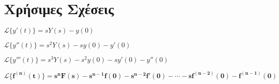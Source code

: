 \section*{Χρήσιμες Σχέσεις}
\centering
\begin{myitemize}
  \item $ \mathcal{L}\{y'(t)\} = sY(s) - y(0) $
  \item $ \mathcal{L}\{y''(t)\} = s^{2}Y(s) - sy(0) - y'(0) $
  \item $ \mathcal{L}\{y'''(t)\} = s^{3}Y(s) - s^{2}y(0) - sy'(0) - y''(0) $
  \item $ \bm{\mathcal{L}\{f^{(n)}(t)\} = s^{n} F(s) - s^{n-1}f(0) - s^{n-2}f'(0) - 
    \cdots - sf^{(n-2)}(0)- f^{(n-1)}(0)} $
\end{myitemize}




